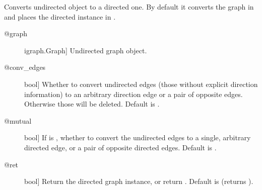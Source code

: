 \documentclass[letterpaper,10pt,english]{sphinxmanual}
\begin{document}
\begin{fulllineitems}
\begin{fulllineitems}
\end{fulllineitems}


\begin{fulllineitems}
\label{\detokenize{main:pypath.main.PyPath.get_directed}}
Converts  undirected  object to a directed one.
By default it converts the graph in  and places the directed
instance in .
\begin{description}
\item[{@graph}] \leavevmode{[}igraph.Graph{]}
Undirected graph object.

\item[{@conv\_edges}] \leavevmode{[}bool{]}
Whether to convert undirected edges (those without explicit
direction information) to an arbitrary direction edge or
a pair of opposite edges.
Otherwise those will be deleted. Default is .

\item[{@mutual}] \leavevmode{[}bool{]}
If  is , whether to convert the
undirected edges to a single, arbitrary directed edge,
or a pair of opposite directed edges. Default is .

\item[{@ret}] \leavevmode{[}bool{]}
Return the directed graph instance, or return .
Default is  (returns ).

\end{description}

\end{fulllineitems}



\end{fulllineitems}
\end{document}
